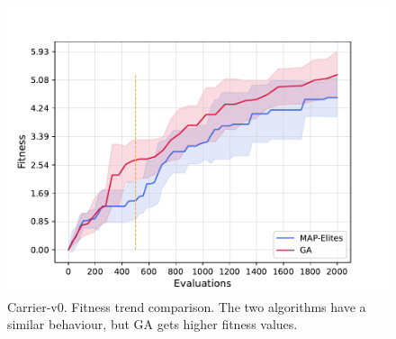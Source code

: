 \begin{figure}[H]
    \centering
    \includegraphics[scale=0.65]{images/brain_opt/carrier/comp_qd_ga_c_ft}
    \caption{Carrier-v0. Fitness trend comparison.
    The two algorithms have a similar behaviour, but GA gets higher fitness values.}
    \label{fig:qd_ga_carrier_ft}
\end{figure}

